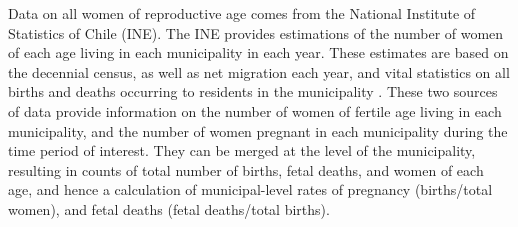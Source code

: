 \documentclass[11pt,subeqn]{article}
\begin{document}
\begin{spacing}{1.4}
Data on all women of reproductive age comes from the National Institute of 
Statistics of Chile (INE). The INE provides estimations of the number of women 
of each age living in each municipality in each year.  These estimates are based 
on the decennial census, as well as net migration each year, and vital 
statistics on all births and deaths occurring to residents in the municipality 
\citep{INE2014}.  These two sources of data provide information on the number
of women of fertile age living in each municipality, and the number of women
pregnant in each municipality during the time period of interest.  They can be
merged at the level of the municipality, resulting in counts of total number of
births, fetal deaths, and women of each age, and hence a calculation of
municipal-level rates of pregnancy (births/total women), and fetal deaths
(fetal deaths/total births).


\end{spacing}
\end{document}
